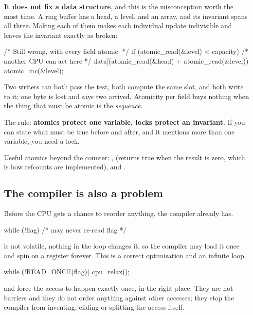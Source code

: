 \textbf{It does not fix a data structure}, and this is the misconception worth the most time. A ring
buffer has a head, a level, and an array, and its invariant spans all three. Making each of them
 makes each individual update indivisible and leaves the invariant exactly as broken:

\begin{ccode}
/* Still wrong, with every field atomic. */
if (atomic_read(&level) < capacity) {      /* another CPU can act here */
        data[(atomic_read(&head) + atomic_read(&level)) %
        atomic_inc(&level);
}
\end{ccode}

\noindent Two writers can both pass the test, both compute the same slot, and both write to it; one
byte is lost and  says two arrived. Atomicity per field buys nothing when the thing that
must be atomic is the \emph{sequence}.

The rule: \textbf{atomics protect one variable, locks protect an invariant.} If you can state what
must be true before and after, and it mentions more than one variable, you need a lock.

Useful atomics beyond the counter: ,  (returns
true when the result is zero, which is how refcounts are implemented), and .

\subsection{The compiler is also a problem}
\label{c7:app:a4}

Before the CPU gets a chance to reorder anything, the compiler already has.

\begin{ccode}
while (!flag) { }        /* may never re-read flag */
\end{ccode}

\noindent {} is not volatile, nothing in the loop changes it, so the compiler may load it
once and spin on a register forever. This is a correct optimisation and an infinite loop.

\begin{ccode}
while (!READ_ONCE(flag)) { cpu_relax(); }
\end{ccode}

\noindent {} and  force the access to happen exactly once, in the
right place. They are not barriers and they do not order anything against other accesses; they stop
the compiler from inventing, eliding or splitting the access itself.

